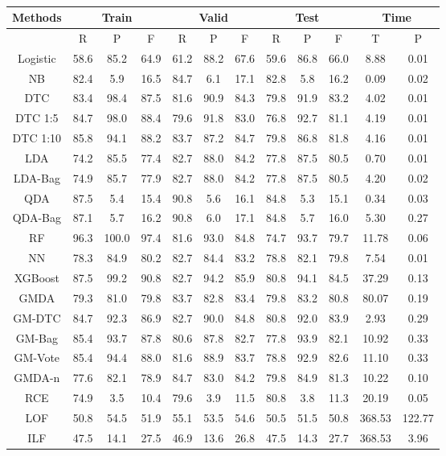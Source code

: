 \documentclass[english]{article}
\begin{document}
\begin{table}[htbp]
	\centering
	\setlength{\belowcaptionskip}{10pt}
	\caption{}
	\begin{tabular}{|c|c|c|c|c|c|c|c|c|c|c|c|}
	\hline
	Methods & \multicolumn{3}{|c|}{Train} & \multicolumn{3}{|c|}{Valid} & \multicolumn{3}{|c|}{Test} & \multicolumn{2}{|c|}{Time}\\
	\hline
	& R & P & F & R & P & F & R & P & F & T & P\\
	\hline
Logistic & 58.6 & 85.2 & 64.9 & 61.2 & 88.2 & 67.6 & 59.6 & 86.8 & 66.0 & 8.88 & 0.01\\
\hline
NB & 82.4 & 5.9 & 16.5 & 84.7 & 6.1 & 17.1 & 82.8 & 5.8 & 16.2 & 0.09 & 0.02\\
\hline
DTC & 83.4 & 98.4 & 87.5 & 81.6 & 90.9 & 84.3 & 79.8 & 91.9 & 83.2 & 4.02 & 0.01\\
\hline
DTC 1:5 & 84.7 & 98.0 & 88.4 & 79.6 & 91.8 & 83.0 & 76.8 & 92.7 & 81.1 & 4.19 & 0.01\\
\hline
DTC 1:10 & 85.8 & 94.1 & 88.2 & 83.7 & 87.2 & 84.7 & 79.8 & 86.8 & 81.8 & 4.16 & 0.01\\
\hline
LDA & 74.2 & 85.5 & 77.4 & 82.7 & 88.0 & 84.2 & 77.8 & 87.5 & 80.5 & 0.70 & 0.01\\
\hline
LDA-Bag & 74.9 & 85.7 & 77.9 & 82.7 & 88.0 & 84.2 & 77.8 & 87.5 & 80.5 & 4.20 & 0.02\\
\hline
QDA & 87.5 & 5.4 & 15.4 & 90.8 & 5.6 & 16.1 & 84.8 & 5.3 & 15.1 & 0.34 & 0.03\\
\hline
QDA-Bag & 87.1 & 5.7 & 16.2 & 90.8 & 6.0 & 17.1 & 84.8 & 5.7 & 16.0 & 5.30 & 0.27\\
\hline
RF & 96.3 & 100.0 & 97.4 & 81.6 & 93.0 & 84.8 & 74.7 & 93.7 & 79.7 & 11.78 & 0.06\\
\hline
NN & 78.3 & 84.9 & 80.2 & 82.7 & 84.4 & 83.2 & 78.8 & 82.1 & 79.8 & 7.54 & 0.01\\
\hline
XGBoost & 87.5 & 99.2 & 90.8 & 82.7 & 94.2 & 85.9 & 80.8 & 94.1 & 84.5 & 37.29 & 0.13\\
\hline
GMDA & 79.3 & 81.0 & 79.8 & 83.7 & 82.8 & 83.4 & 79.8 & 83.2 & 80.8 & 80.07 & 0.19 \\
\hline
GM-DTC & 84.7 & 92.3 & 86.9 & 82.7 & 90.0 & 84.8 & 80.8 & 92.0 & 83.9 & 2.93 & 0.29 \\
\hline
GM-Bag & 85.4 & 93.7 & 87.8 & 80.6 & 87.8 & 82.7 & 77.8 & 93.9 & 82.1 & 10.92 & 0.33 \\
\hline
GM-Vote & 85.4 & 94.4 & 88.0 & 81.6 & 88.9 & 83.7 & 78.8 & 92.9 & 82.6 & 11.10 & 0.33 \\
\hline
GMDA-n & 77.6 & 82.1 & 78.9 & 84.7 & 83.0 & 84.2 & 79.8 & 84.9 & 81.3 & 10.22 & 0.10 \\
\hline
RCE & 74.9 & 3.5 & 10.4 & 79.6 & 3.9 & 11.5 & 80.8 & 3.8 & 11.3 & 20.19 & 0.05 \\
\hline
LOF & 50.8 & 54.5 & 51.9 & 55.1 & 53.5 & 54.6 & 50.5 & 51.5 & 50.8 & 368.53 & 122.77 \\
\hline
ILF & 47.5 & 14.1 & 27.5 & 46.9 & 13.6 & 26.8 & 47.5 & 14.3 & 27.7 & 368.53 & 3.96 \\
\hline
	\end{tabular}
\end{table}
\end{document}

